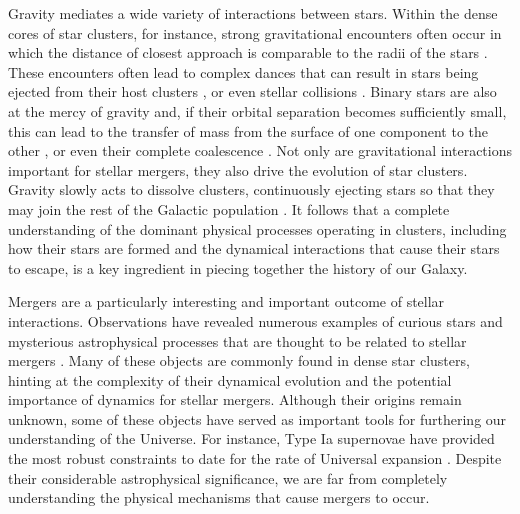Gravity mediates a wide variety of interactions between stars.  Within
the dense cores of star clusters, for instance, strong gravitational 
encounters often occur in which the distance of closest approach is
comparable to the radii of the stars \citep[e.g.][]{spitzer72,
  spitzer75, heggie75, hut83b}.  These encounters often lead to
complex dances that can result in stars being ejected from their host
clusters \citep[e.g.][]{henon69, hut92, kroupa02b, demarchi10}, or even
stellar collisions \citep[e.g.][]{leonard89, sills01}.
Binary stars are also at the
mercy of gravity and, if their orbital separation becomes sufficiently
small, this can lead to the transfer of mass from the surface of one
component to the other \citep{mccrea64}, or even their complete
coalescence \citep[e.g.][]{andronov06}.
Not only are gravitational interactions important for stellar mergers,
they also drive the evolution of star clusters.  Gravity slowly acts
to dissolve clusters, continuously ejecting stars so that they may
join the rest of the Galactic population
\citep[e.g.][]{portegieszwart01}.  It follows that a complete 
understanding of the
dominant physical processes operating in clusters, including how their
stars are formed and the dynamical interactions that cause their stars
to escape, is a key ingredient in piecing together the history of our
Galaxy.  

Mergers are a particularly interesting and important outcome of
stellar interactions.  Observations have revealed 
numerous examples of curious stars and mysterious astrophysical
processes that are thought to be related to stellar mergers
\citep[e.g.][]{sandage53, webbink84, paczynski86, troja10,
  miroshnichenko07, farrell09}.  
Many
of these objects are commonly found in dense star clusters, hinting at
the complexity of their dynamical evolution and the potential
importance of dynamics for stellar mergers.  
Although their origins remain unknown, some of these 
objects have served as important tools for furthering our 
understanding of the Universe.  For instance, Type Ia supernovae
have provided the most robust constraints to date for the rate of
Universal expansion \citep[e.g.][]{perlmutter99}.  Despite their 
considerable astrophysical significance, we are far from completely
understanding the physical mechanisms that cause mergers to occur.  

